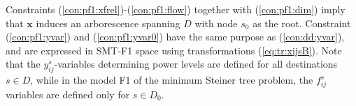     Constraints (\ref{con:pf1:xfrel})-(\ref{con:pf1:flow}) together with (\ref{con:pf1:dim}) imply that $\mathbf{x}$ induces an arborescence spanning $D$ with node $s_0$ as the root. Constraint (\ref{con:pf1:yvar}) and (\ref{con:pf1:yvar0}) have the same purpose as (\ref{con:dd:yvar}), and are expressed in SMT-F1 space using transformations (\ref{eq:tr:xijsB}). Note that the $y_{ij}^s$-variables determining power levels are defined for all destinations $s\in D$, while in the model F1 \cite{Polzin} of the minimum Steiner tree problem, the $f_{ij}^s$ variables are defined only for $s\in D_0$.
     
